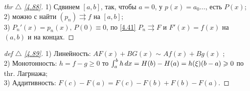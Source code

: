 
\begin{minipage}[]{0.45\textwidth}
\begin{proof}[
thr $\triangle$
\eqref{4.88}]

\phantom{42}
\noindent

1) Сдвинем $[a,b]$, так, чтобы $a=0$, у $p(x)= a_0 \ldots$, есть $P(x)$;\\
2) можно с найти $(p_n) \rightrightarrows f$ на $[a,b]$;\\
3) $P_n'(x) = p_n(x), \, P(0) \equiv 0$, по \eqref{4.41} $P_n \rightrightarrows F$ и $F'(x) = f(x)$ на $(a,b)$ и на концах.

\end{proof}
\end{minipage}
\hfill
\begin{minipage}[]{0.45\textwidth}
\begin{proof}[
 def $\triangle$
\eqref{4.89}]

\phantom{42}
\noindent

1) Линейность: $A F(x) + B G(x)$ $\sim$ $A f(x) + B g(x)$ ;\\
2) Монотонность: $h = f - g \geq 0$ то $\int_a^b h \, d x = H(b) - H(a) = h(\xi)(b-a)\geqslant 0$ по thr. Лагрнажа;\\
3) Аддитивность: $F(c) - F(a) = F(c) - F(b) + F(b) - F(a)$.
\end{proof}
\end{minipage}

